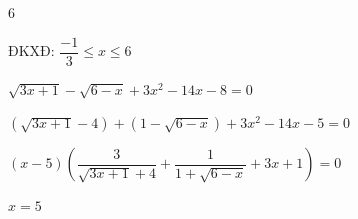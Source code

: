 \begin{Solbook}{6}
 \par \noindent  ĐKXĐ: $\dfrac {-1}{3}\le x \le 6$\\ \par $\sqrt {3 x+1}-\sqrt {6-x}+3 x^{2}-14x-8=0$\\ \par $(\sqrt {3x+1}-4)+(1-\sqrt {6-x})+3 x^{2}-14x-5=0$\\ \par $(x-5)\left (\dfrac {3}{\sqrt {3x+1}+4}+\dfrac {1}{1+\sqrt {6-x}}+3x+1\right )=0$\\ \par $x=5$  \hfill \qedEX 
\end{Solbook}
